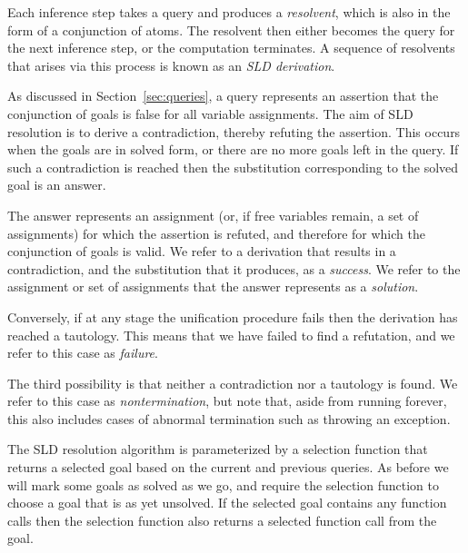 Each inference step takes a query
and produces a \emph{resolvent\label{gi:resolvent}},
which is also in the form of a conjunction of atoms.
The resolvent then
either becomes the query for the next inference step,
or the computation terminates.
A sequence of resolvents that arises via this process
is known as an \emph{SLD derivation\label{gi:derivation}}.

As discussed in Section~\ref{sec:queries},
a query represents an assertion that
the conjunction of goals is false for all variable assignments.
The aim of SLD resolution is to derive a contradiction,
thereby refuting the assertion.
This occurs when the goals are in solved form,
or there are no more goals left in the query.
If such a contradiction is reached then
the substitution corresponding to the solved goal is an answer.

The answer represents an assignment
(or, if free variables remain, a set of assignments)
for which the assertion is refuted,
and therefore for which the conjunction of goals is valid.
We refer to a derivation that results in a contradiction,
and the substitution that it produces,
as a \emph{success\label{gi:success}}.
We refer to the assignment or set of assignments
that the answer\label{gi:answer2} represents
as a \emph{solution\label{gi:solution3}}.

Conversely,
if at any stage the unification procedure fails
then the derivation has reached a tautology.
This means that we have failed to find a refutation,
and we refer to this case as \emph{failure\label{gi:failure}}.

The third possibility is that
neither a contradiction nor a tautology is found.
We refer to this case as \emph{nontermination\label{gi:nontermination}},
but note that, aside from running forever,
this also includes cases of
abnormal termination such as throwing an exception.

The SLD resolution algorithm is
parameterized by a selection function
that returns a selected goal
based on the current and previous queries.
As before we will mark some goals as solved as we go,
and require the selection function
to choose a goal that is as yet unsolved.
If the selected goal contains any function calls
then the selection function also returns
a selected function call from the goal.

